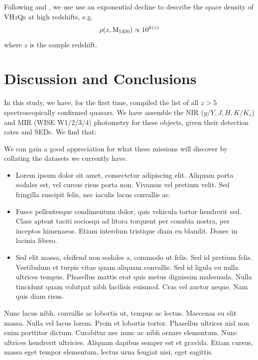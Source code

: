 \documentclass[usenatbib]{mnras}
\begin{document}
Following \citet{Fan2001b} and \citet{McGreer2013}, we use use an
exponential decline to describe the space density of VH$z$Qs at high
redshifts, e.g.
\begin{equation}
\rho(z, {\rm M}_{1450}) \propto 10^{k (z)}
\end{equation}
where $z$ is the sample redshift. 





\section{Discussion and Conclusions}
\label{sec:conclusions}
In this study, we have, for the first time, compiled the list of all
$z>5$ spectroscopically confirmed quasars. We have assemble the NIR
($y/Y, J, H, K/K_{s}$) and MIR (WISE W1/2/3/4) photometry for these
objects, given their detection rates and SEDs. We find that: 

We can gain a good appreciation for what these missions will discover
by collating the datasets we currently have. 

\begin{itemize}
    \item Lorem ipsum dolor sit amet, consectetur adipiscing
      elit. Aliquam porta sodales est, vel cursus risus porta non. Vivamus
      vel pretium velit. Sed fringilla suscipit felis, nec iaculis lacus
      convallis ac. 
    \item Fusce pellentesque condimentum dolor, quis vehicula
      tortor hendrerit sed. Class aptent taciti sociosqu ad litora torquent
      per conubia nostra, per inceptos himenaeos. Etiam interdum tristique
      diam eu blandit. Donec in lacinia libero.
    \item Sed elit massa, eleifend non sodales a, commodo ut felis. Sed id
      pretium felis. Vestibulum et turpis vitae quam aliquam convallis. Sed
      id ligula eu nulla ultrices tempus. Phasellus mattis erat quis metus
      dignissim malesuada. Nulla tincidunt quam volutpat nibh facilisis
      euismod. Cras vel auctor neque. Nam quis diam risus.
\end{itemize}
Nunc lacus nibh, convallis ac lobortis ut, tempus ac lectus. Maecenas
eu elit massa. Nulla vel lacus lorem. Proin et lobortis
tortor. Phasellus ultrices nisl non enim porttitor dictum. Curabitur
nec nunc ac nibh ornare elementum. Nunc ultrices hendrerit
ultricies. Aliquam dapibus semper est et gravida. Etiam cursus, massa
eget tempor elementum, lectus urna feugiat nisi, eget sagittis.
\end{document}
